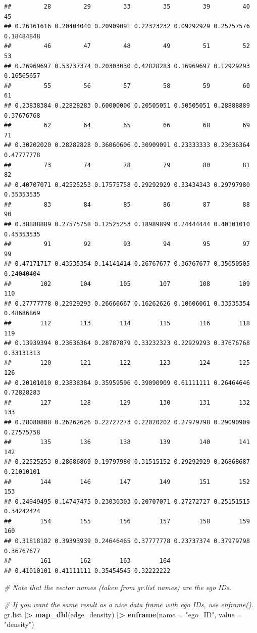 \documentclass[
]{book}
\newenvironment{Shaded}{\begin{snugshade}}{\end{snugshade}}
\newcommand{\AttributeTok}[1]{\textcolor[rgb]{0.13,0.29,0.53}{#1}}
\newcommand{\CommentTok}[1]{\textcolor[rgb]{0.56,0.35,0.01}{\textit{#1}}}
\newcommand{\FunctionTok}[1]{\textcolor[rgb]{0.13,0.29,0.53}{\textbf{#1}}}
\newcommand{\NormalTok}[1]{#1}
\newcommand{\SpecialCharTok}[1]{\textcolor[rgb]{0.81,0.36,0.00}{\textbf{#1}}}
\newcommand{\StringTok}[1]{\textcolor[rgb]{0.31,0.60,0.02}{#1}}
\begin{document}
\begin{verbatim}
##         28         29         33         35         39         40         45 
## 0.26161616 0.20404040 0.20909091 0.22323232 0.09292929 0.25757576 0.18484848 
##         46         47         48         49         51         52         53 
## 0.26969697 0.53737374 0.20303030 0.42828283 0.16969697 0.12929293 0.16565657 
##         55         56         57         58         59         60         61 
## 0.23838384 0.22828283 0.60000000 0.20505051 0.50505051 0.28888889 0.37676768 
##         62         64         65         66         68         69         71 
## 0.30202020 0.28282828 0.36060606 0.30909091 0.23333333 0.23636364 0.47777778 
##         73         74         78         79         80         81         82 
## 0.40707071 0.42525253 0.17575758 0.29292929 0.33434343 0.29797980 0.35353535 
##         83         84         85         86         87         88         90 
## 0.38888889 0.27575758 0.12525253 0.18989899 0.24444444 0.40101010 0.45353535 
##         91         92         93         94         95         97         99 
## 0.47171717 0.43535354 0.14141414 0.26767677 0.36767677 0.35050505 0.24040404 
##        102        104        105        107        108        109        110 
## 0.27777778 0.22929293 0.26666667 0.16262626 0.10606061 0.33535354 0.48686869 
##        112        113        114        115        116        118        119 
## 0.13939394 0.23636364 0.28787879 0.33232323 0.22929293 0.37676768 0.33131313 
##        120        121        122        123        124        125        126 
## 0.20101010 0.23838384 0.35959596 0.39090909 0.61111111 0.26464646 0.72828283 
##        127        128        129        130        131        132        133 
## 0.28080808 0.26262626 0.22727273 0.22020202 0.27979798 0.29090909 0.27575758 
##        135        136        138        139        140        141        142 
## 0.22525253 0.28686869 0.19797980 0.31515152 0.29292929 0.26868687 0.21010101 
##        144        146        147        149        151        152        153 
## 0.24949495 0.14747475 0.23030303 0.20707071 0.27272727 0.25151515 0.34242424 
##        154        155        156        157        158        159        160 
## 0.31818182 0.39393939 0.24646465 0.37777778 0.23737374 0.37979798 0.36767677 
##        161        162        163        164 
## 0.41010101 0.41111111 0.35454545 0.32222222
\end{verbatim}

\begin{Shaded}
\begin{Highlighting}[]
\CommentTok{\# Note that the vector names (taken from gr.list names) are the ego IDs.}

\CommentTok{\# If you want the same result as a nice data frame with ego IDs, use enframe().}
\NormalTok{gr.list }\SpecialCharTok{|\textgreater{}}
  \FunctionTok{map\_dbl}\NormalTok{(edge\_density) }\SpecialCharTok{|\textgreater{}} 
  \FunctionTok{enframe}\NormalTok{(}\AttributeTok{name =} \StringTok{"ego\_ID"}\NormalTok{, }\AttributeTok{value =} \StringTok{"density"}\NormalTok{)}
\end{Highlighting}
\end{Shaded}
\end{document}
